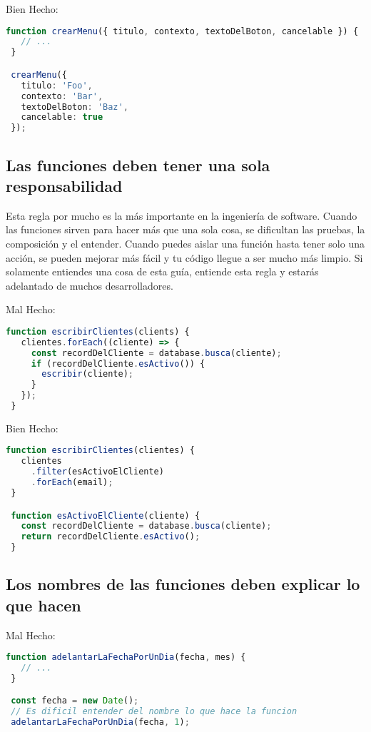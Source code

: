 Bien Hecho:
\begin{lstlisting}[language=TypeScript, style=goodstyle]
 function crearMenu({ titulo, contexto, textoDelBoton, cancelable }) {
   // ...
 }

 crearMenu({
   titulo: 'Foo',
   contexto: 'Bar',
   textoDelBoton: 'Baz',
   cancelable: true
 });
\end{lstlisting}

\newpage

\subsection*{Las funciones deben tener una sola responsabilidad}

Esta regla por mucho es la más importante en la ingeniería de software. Cuando las funciones sirven para hacer más que una sola cosa, se dificultan las pruebas, la composición y el entender. Cuando puedes aislar una función hasta tener solo una acción, se pueden mejorar más fácil y tu código llegue a ser mucho más limpio. Si solamente entiendes una cosa de esta guía, entiende esta regla y estarás adelantado de muchos desarrolladores.


Mal Hecho:
\begin{lstlisting}[language=TypeScript, style=badstyle]
 function escribirClientes(clients) {
   clientes.forEach((cliente) => {
     const recordDelCliente = database.busca(cliente);
     if (recordDelCliente.esActivo()) {
       escribir(cliente);
     }
   });
 }
\end{lstlisting}
\vspace{0.5cm} %

Bien Hecho:
\begin{lstlisting}[language=TypeScript, style=goodstyle]
 function escribirClientes(clientes) {
   clientes
     .filter(esActivoElCliente)
     .forEach(email);
 }

 function esActivoElCliente(cliente) {
   const recordDelCliente = database.busca(cliente);
   return recordDelCliente.esActivo();
 }
\end{lstlisting}

\subsection*{Los nombres de las funciones deben explicar lo que hacen}

Mal Hecho:
\begin{lstlisting}[language=TypeScript, style=badstyle]
 function adelantarLaFechaPorUnDia(fecha, mes) {
   // ...
 }

 const fecha = new Date();
 // Es dificil entender del nombre lo que hace la funcion
 adelantarLaFechaPorUnDia(fecha, 1);
\end{lstlisting}
\vspace{0.5cm} %

